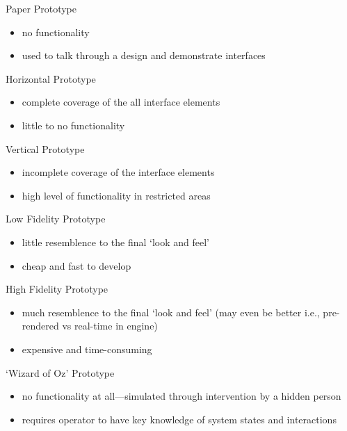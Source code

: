 \begin{frame}{Paper Prototype}
	\begin{itemize}
		\item no functionality
		\item used to talk through a design and demonstrate interfaces
	\end{itemize}
\end{frame}

\begin{frame}{Horizontal Prototype}
	\begin{itemize}
		\item complete coverage of the all interface elements
		\item little to no functionality
	\end{itemize}
\end{frame}

\begin{frame}{Vertical Prototype}
	\begin{itemize}
		\item incomplete coverage of the interface elements
		\item high level of functionality in restricted areas
	\end{itemize}
\end{frame}

\begin{frame}{Low Fidelity Prototype}
	\begin{itemize}
		\item little resemblence to the final `look and feel'
		\item cheap and fast to develop
	\end{itemize}
\end{frame}

\begin{frame}{High Fidelity Prototype}
	\begin{itemize}
		\item much resemblence to the final `look and feel' (may even be better i.e., pre-rendered vs real-time in engine)
		\item expensive and time-consuming
	\end{itemize}
\end{frame}

\begin{frame}{`Wizard of Oz' Prototype}
	\begin{itemize}
		\item no functionality at all---simulated through intervention by a hidden person
		\item requires operator to have key knowledge of system states and interactions
	\end{itemize}
\end{frame}

